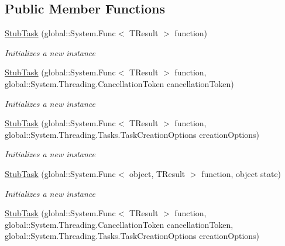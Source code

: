 \subsection*{Public Member Functions}
\begin{DoxyCompactItemize}
\item 
\hyperlink{class_system_1_1_threading_1_1_tasks_1_1_fakes_1_1_stub_task_3_01_t_result_01_4_ac264be0319ab7b2db26c841d622b4071}{Stub\-Task} (global\-::\-System.\-Func$<$ T\-Result $>$ function)
\begin{DoxyCompactList}\small\item\em Initializes a new instance\end{DoxyCompactList}\item 
\hyperlink{class_system_1_1_threading_1_1_tasks_1_1_fakes_1_1_stub_task_3_01_t_result_01_4_a0bd9c59acee4f895ae8c24398a75d82e}{Stub\-Task} (global\-::\-System.\-Func$<$ T\-Result $>$ function, global\-::\-System.\-Threading.\-Cancellation\-Token cancellation\-Token)
\begin{DoxyCompactList}\small\item\em Initializes a new instance\end{DoxyCompactList}\item 
\hyperlink{class_system_1_1_threading_1_1_tasks_1_1_fakes_1_1_stub_task_3_01_t_result_01_4_a3becc2418caf46636693faa9d41c458b}{Stub\-Task} (global\-::\-System.\-Func$<$ T\-Result $>$ function, global\-::\-System.\-Threading.\-Tasks.\-Task\-Creation\-Options creation\-Options)
\begin{DoxyCompactList}\small\item\em Initializes a new instance\end{DoxyCompactList}\item 
\hyperlink{class_system_1_1_threading_1_1_tasks_1_1_fakes_1_1_stub_task_3_01_t_result_01_4_ad0204c50095b1affdf621f72bf32056e}{Stub\-Task} (global\-::\-System.\-Func$<$ object, T\-Result $>$ function, object state)
\begin{DoxyCompactList}\small\item\em Initializes a new instance\end{DoxyCompactList}\item 
\hyperlink{class_system_1_1_threading_1_1_tasks_1_1_fakes_1_1_stub_task_3_01_t_result_01_4_a631fe650623abe2f3bd2c8fa8033831e}{Stub\-Task} (global\-::\-System.\-Func$<$ T\-Result $>$ function, global\-::\-System.\-Threading.\-Cancellation\-Token cancellation\-Token, global\-::\-System.\-Threading.\-Tasks.\-Task\-Creation\-Options creation\-Options)

\end{DoxyCompactItemize}
